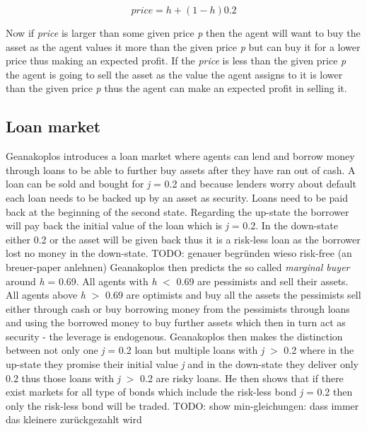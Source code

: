 \documentclass[../Bachelorarbeit.tex]{subfiles}
\begin{document}
\begin{equation}
price = h + (1 - h)0.2
\end{equation}

Now if \textit{price} is larger than some given price \textit{p} then the agent will want to buy the asset as the agent values it more than the given price \textit{p} but can buy it for a lower price thus making an expected profit. If the \textit{price} is less than the given price \textit{p} the agent is going to sell the asset as the value the agent assigns to it is lower than the given price \textit{p} thus the agent can make an expected profit in selling it.

\subsection{Loan market}
Geanakoplos introduces a loan market where agents can lend and borrow money through loans to be able to further buy assets after they have ran out of cash. A loan can be sold and bought for \textit{j} = 0.2 and because lenders worry about default each loan needs to be backed up by an asset as security. Loans need to be paid back at the beginning of the second state. Regarding the up-state the borrower will pay back the initial value of the loan which is \textit{j} = 0.2. In the down-state either 0.2 or the asset will be given back thus it is a risk-less loan as the borrower lost no money in the down-state. TODO: genauer begründen wieso risk-free (an breuer-paper anlehnen)
\linebreak
Geanakoplos then predicts the so called \textit{marginal buyer} around \textit{h} = 0.69. All agents with \textit{h} $<$ 0.69 are pessimists and sell their assets. All agents above \textit{h} $>$ 0.69 are optimists and buy all the assets the pessimists sell either through cash or buy borrowing money from the pessimists through loans and using the borrowed money to buy further assets which then in turn act as security - the leverage is endogenous.
\linebreak
Geanakoplos then makes the distinction between not only one \textit{j} = 0.2 loan but multiple loans with \textit{j} $>$ 0.2 where in the up-state they promise their initial value \textit{j} and in the down-state they deliver only 0.2 thus those loans with \textit{j} $>$ 0.2 are risky loans. He then shows that if there exist markets for all type of bonds which include the risk-less bond \textit{j} = 0.2 then only the risk-less bond will be traded. TODO: show min-gleichungen: dass immer das kleinere zurückgezahlt wird
\end{document}
